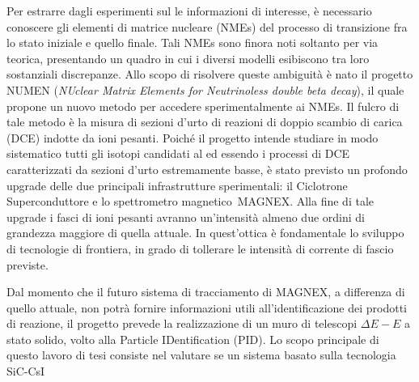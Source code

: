 Per estrarre dagli esperimenti sul \doppiobeta{} le informazioni di interesse, è necessario conoscere gli elementi di matrice nucleare (NMEs) del processo di transizione fra lo stato iniziale e quello finale. 
Tali NMEs sono finora noti soltanto per via teorica, presentando un quadro in cui i diversi modelli esibiscono tra loro sostanziali discrepanze.
Allo scopo di risolvere queste ambiguità è nato il progetto NUMEN (\emph{NUclear Matrix Elements for Neutrinoless double beta decay}), il quale propone un nuovo metodo per accedere sperimentalmente ai NMEs.
Il fulcro di tale metodo è la misura di sezioni d'urto di reazioni di doppio scambio di carica (DCE) indotte da ioni pesanti.
Poiché il progetto intende studiare in modo sistematico tutti gli isotopi candidati al \doppiobeta{} ed essendo i processi di DCE caratterizzati da sezioni d'urto estremamente basse, è stato previsto un profondo upgrade delle due principali infrastrutture sperimentali: il Ciclotrone Superconduttore e lo spettrometro magnetico~MAGNEX. 
Alla fine di tale upgrade i fasci di ioni pesanti avranno un'intensità almeno due ordini di grandezza maggiore di quella attuale.
In quest'ottica è fondamentale lo sviluppo di tecnologie di frontiera, in grado di tollerare le intensità di corrente di fascio previste.

Dal momento che il futuro sistema di tracciamento di MAGNEX, a differenza di quello attuale, non potrà fornire informazioni utili all'identificazione dei prodotti di reazione, il progetto prevede la realizzazione di un muro di telescopi $\Delta E - E$ a stato solido, volto alla Particle IDentification (PID). 
Lo scopo principale di questo lavoro di tesi consiste nel valutare se un sistema basato sulla tecnologia SiC-CsI 




